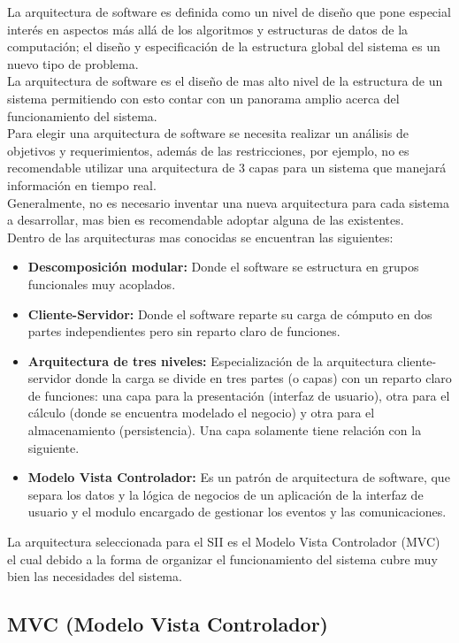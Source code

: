 La arquitectura de software es definida como un nivel de dise\~no que pone especial inter\'es en aspectos m\'as all\'a de  los algoritmos y estructuras de datos de la computaci\'on; el dise\~no y especificaci\'on de la estructura global del sistema es un nuevo tipo de problema.\\

La arquitectura de software es el dise\~no de mas alto nivel  de la estructura de un sistema permitiendo con esto contar con un panorama amplio acerca del funcionamiento del sistema.\\

Para elegir una arquitectura de software se necesita realizar un an\'alisis de objetivos y requerimientos, adem\'as de las restricciones, por ejemplo, no es recomendable utilizar una arquitectura de 3 capas para un sistema que manejar\'a informaci\'on en tiempo real.\\

Generalmente, no es necesario inventar una nueva arquitectura para cada sistema a desarrollar, mas bien es recomendable adoptar alguna de las existentes.\\

Dentro de las arquitecturas mas conocidas se encuentran las siguientes:\\
\begin{itemize}
	\item \textbf{Descomposici\'on modular:} Donde el software se estructura en grupos funcionales muy acoplados.
	\item \textbf{Cliente-Servidor:} Donde el software reparte su carga de c\'omputo en dos partes independientes pero sin reparto claro de funciones.
	\item \textbf{Arquitectura de tres niveles:} Especializaci\'on de la arquitectura cliente-servidor donde la carga se divide en tres partes (o capas) con un reparto claro de funciones: una capa para la presentaci\'on (interfaz de usuario), otra para el c\'alculo (donde se encuentra modelado el negocio) y otra para el almacenamiento (persistencia). Una capa solamente tiene relaci\'on con la siguiente.
	\item \textbf{Modelo Vista Controlador:} Es un patr\'on de arquitectura de software, que separa  los datos y la l\'ogica de negocios de un aplicaci\'on de la interfaz de usuario y el modulo encargado de gestionar  los eventos y las comunicaciones.
\end{itemize}

La arquitectura seleccionada para el SII es el Modelo Vista Controlador (MVC) el cual debido a la forma de organizar el funcionamiento del sistema cubre muy bien las necesidades del sistema.
	\subsection{MVC (Modelo Vista Controlador)}
